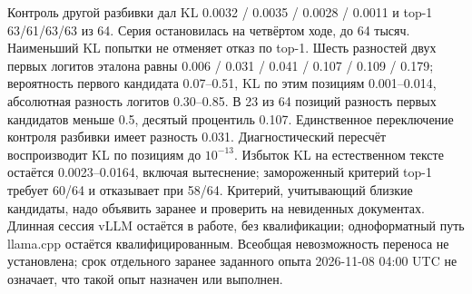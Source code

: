 Контроль другой разбивки дал KL 0.0032 / 0.0035 / 0.0028 / 0.0011 и top-1 63/61/63/63 из 64.
Серия остановилась на четвёртом ходе, до 64 тысяч. Наименьший KL попытки не отменяет отказ по top-1.
Шесть разностей двух первых логитов эталона равны 0.006 / 0.031 / 0.041 / 0.107 / 0.109 / 0.179;
вероятность первого кандидата 0.07--0.51, KL по этим позициям 0.001--0.014,
абсолютная разность логитов 0.30--0.85. В 23 из 64 позиций разность первых кандидатов меньше 0.5,
десятый процентиль 0.107. Единственное переключение контроля разбивки имеет разность 0.031.
Диагностический пересчёт воспроизводит KL по позициям до $10^{-13}$.
Избыток KL на естественном тексте остаётся 0.0023--0.0164, включая вытеснение;
замороженный критерий top-1 требует 60/64 и отказывает при 58/64.
Критерий, учитывающий близкие кандидаты, надо объявить заранее и проверить на невиденных документах.
Длинная сессия vLLM остаётся в работе, без квалификации; одноформатный путь llama.cpp остаётся квалифицированным.
Всеобщая невозможность переноса не установлена; срок отдельного заранее заданного опыта 2026-11-08 04:00 UTC
не означает, что такой опыт назначен или выполнен.

